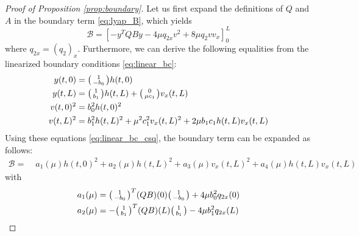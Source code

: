 \documentclass[11pt]{article}
\begin{document}
\begin{proof}[Proof of Proposition \ref{prop:boundary}]
Let us first expand the definitions of $Q$ and $A$ in the boundary term \eqref{eq:lyap_B}, which yields
\begin{equation}
    \mathcal{B} = \left[ -y^TQBy - 4\mu q_{2x} v^2 + 8 \mu q_2 vv_x \right]_0^L
\end{equation}
where $q_{2x} = (q_2)_x$. Furthermore, we can derive the following equalities from the linearized boundary conditions \eqref{eq:linear_bc}:
\begin{equation}
    \begin{split}
        y(t,0) &= \begin{psmallmatrix} 1 \\ -b_0 \end{psmallmatrix} h(t,0) \\
        y(t,L) &= \begin{psmallmatrix}1 \\ b_1\end{psmallmatrix} h(t,L) + \begin{psmallmatrix}0 \\ \mu c_1\end{psmallmatrix} v_x(t,L) \\
        v(t,0)^2 &= b_0^2 h(t,0)^2 \\
        v(t,L)^2 &= b_1^2 h(t,L)^2 + \mu^2 c_1^2 v_x(t,L)^2 + 2 \mu b_1 c_1 h(t,L) v_x(t,L)
    \end{split}
    \label{eq:linear_bc_csq}
\end{equation}
Using these equations \eqref{eq:linear_bc_csq}, the boundary term can be expanded as follows:
\begin{equation}
\begin{split}
    \mathcal B = & \; a_1(\mu) h(t,0)^2 + a_2(\mu) h(t,L)^2 + a_3(\mu) v_x(t,L)^2+ a_4(\mu) h(t,L) v_x(t,L)
\end{split}
\end{equation}
with
\begin{align}
    a_1(\mu) &= \begin{psmallmatrix}1 \\ -b_0\end{psmallmatrix}^T (QB)(0) \begin{psmallmatrix}1 \\ -b_0\end{psmallmatrix} + 4\mu b_0^2 q_{2x}(0) \\
    a_2(\mu) &= -\begin{psmallmatrix}1 \\ b_1\end{psmallmatrix}^T (QB)(L) \begin{psmallmatrix}1 \\ b_1\end{psmallmatrix} - 4\mu b_1^2 q_{2x}(L) \\

\end{align}
\end{proof}
\end{document}
